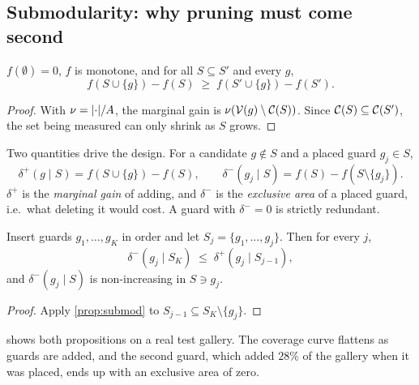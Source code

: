 \documentclass[11pt,a4paper]{article}
\begin{document}
\subsection{Submodularity: why pruning must come second}\label{sec:submod}

\begin{proposition}\label{prop:submod}
$f(\emptyset)=0$, $f$ is monotone, and for all $S \subseteq S'$ and every $g$,
\[
  f(S\cup\{g\}) - f(S) \;\ge\; f(S'\cup\{g\}) - f(S').
\]
\end{proposition}

\begin{proof}
With $\nu = \lvert \cdot \rvert/A$, the marginal gain is $\nu(\mathcal{V}(g)\setminus\mathcal{C}(S))$. Since
$\mathcal{C}(S)\subseteq\mathcal{C}(S')$, the set being measured can only shrink as $S$ grows.
\end{proof}

Two quantities drive the design. For a candidate $g \notin S$ and a placed guard $g_j\in S$,
\[
  \delta^{+}(g\mid S) = f(S\cup\{g\}) - f(S),
  \qquad
  \delta^{-}(g_j\mid S) = f(S) - f(S\setminus\{g_j\}).
\]
$\delta^+$ is the \emph{marginal gain} of adding, and $\delta^-$ is the \emph{exclusive area}
of a placed guard, i.e.\ what deleting it would cost. A guard with $\delta^-=0$ is strictly
redundant.

\begin{proposition}\label{prop:redundancy}
Insert guards $g_1,\dots,g_K$ in order and let $S_j=\{g_1,\dots,g_j\}$. Then for every $j$,
\[
  \delta^-(g_j\mid S_K) \;\le\; \delta^+(g_j\mid S_{j-1}),
\]
and $\delta^-(g_j\mid S)$ is non-increasing in $S \ni g_j$.
\end{proposition}

\begin{proof}
Apply \cref{prop:submod} to $S_{j-1}\subseteq S_K\setminus\{g_j\}$.
\end{proof}

 shows both propositions on a real test gallery. The coverage curve flattens
as guards are added, and the second guard, which added $28\%$ of the gallery when it was
placed, ends up with an exclusive area of zero.
\end{document}
